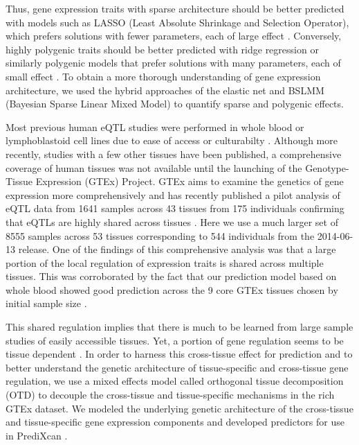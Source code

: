 \documentclass[10pt,letterpaper]{article}
\begin{document}
Thus, gene expression traits with sparse architecture should be better predicted with models such as LASSO (Least Absolute Shrinkage and Selection Operator), which prefers solutions with fewer parameters, each of large effect \cite{Tibshirani_1996}. Conversely, highly polygenic traits should be better predicted with ridge regression or similarly polygenic models that prefer solutions with many parameters, each of small effect \cite{Hoerl_1970,de_los_Campos_2010,Wheeler_2014}. To obtain a more thorough understanding of gene expression architecture, we used the hybrid approaches of the elastic net and BSLMM (Bayesian Sparse Linear Mixed Model) \cite{Zhou_2013} to quantify sparse and polygenic effects.

Most previous human eQTL studies were performed in whole blood or lymphoblastoid cell lines due to ease of access or culturabilty \cite{Stranger_2007,Cheung_2005,Battle_2013}. Although more recently, studies with a few other tissues have been published, a comprehensive coverage of human tissues was not available until the launching of the Genotype-Tissue Expression (GTEx) Project. GTEx aims to examine the genetics of gene expression more comprehensively and has recently published a pilot analysis of eQTL data from 1641 samples across 43 tissues from 175 individuals confirming that eQTLs are highly shared across tissues \cite{Ardlie_2015}. Here we use a much larger set of 8555 samples across 53 tissues corresponding to 544 individuals from the 2014-06-13 release. One of the findings of this comprehensive analysis was that a large portion of the local regulation of expression traits is shared across multiple tissues. This was corroborated by the fact that our prediction model based on whole blood showed good prediction across the 9 core GTEx tissues chosen by initial sample size \cite{Gamazon_2015}.

This shared regulation implies that there is much to be learned from large sample studies of easily accessible tissues. Yet, a portion of gene regulation seems to be tissue dependent \cite{Ardlie_2015}. In order to harness this cross-tissue effect for prediction and to better understand the genetic architecture of tissue-specific and cross-tissue gene regulation, we use a mixed effects model called orthogonal tissue decomposition (OTD) to decouple the cross-tissue and tissue-specific mechanisms in the rich GTEx dataset. We modeled the underlying genetic architecture of the cross-tissue and tissue-specific gene expression components and developed predictors for use in PrediXcan \cite{Gamazon_2015}.
\end{document}
